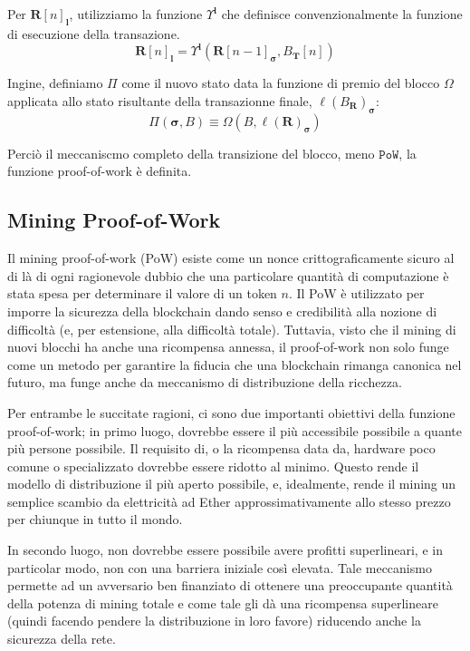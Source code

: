 \documentclass[9pt,oneside]{amsart}
\begin{document}
\begin{multicols}{2}
Per  $\mathbf{R}[n]_\mathbf{l}$, utilizziamo la funzione $\Upsilon^\mathbf{l}$ che definisce convenzionalmente la funzione di esecuzione della transazione.
\begin{equation}
\mathbf{R}[n]_\mathbf{l} = 
\Upsilon^\mathbf{l}(\mathbf{R}[n - 1]_{\boldsymbol{\sigma}}, B_\mathbf{T}[n])
\end{equation}

Ingine, definiamo $\Pi$ come il nuovo stato data la funzione di premio del blocco $\Omega$ applicata allo stato risultante della transazionne finale, $\ell(B_\mathbf{R})_{\boldsymbol{\sigma}}$:
\begin{equation}
\Pi(\boldsymbol{\sigma}, B) \equiv \Omega(B, \ell(\mathbf{R})_{\boldsymbol{\sigma}})
\end{equation}

Perciò il meccaniscmo completo della transizione del blocco, meno $\mathtt{PoW}$, la funzione proof-of-work è definita.

\subsection{Mining Proof-of-Work} \label{ch:pow}

Il mining proof-of-work (PoW) esiste come un nonce crittograficamente sicuro al di là di ogni ragionevole dubbio che una particolare quantità di computazione è stata spesa per determinare il valore di un token $n$. Il PoW è utilizzato per imporre la sicurezza della blockchain dando senso e credibilità alla nozione di difficoltà (e, per estensione, alla difficoltà totale). Tuttavia, visto che il mining di nuovi blocchi ha anche una ricompensa annessa, il proof-of-work non solo funge come un metodo per garantire la fiducia che una blockchain rimanga canonica nel futuro, ma funge anche da meccanismo di distribuzione della ricchezza.

Per entrambe le succitate ragioni, ci sono due importanti obiettivi della funzione proof-of-work; in primo luogo, dovrebbe essere il più accessibile possibile a quante più persone possibile. Il requisito di, o la ricompensa data da, hardware poco comune o specializzato dovrebbe essere ridotto al minimo. Questo rende il modello di distribuzione il più aperto possibile, e, idealmente, rende il mining un semplice scambio da elettricità ad Ether approssimativamente allo stesso prezzo per chiunque in tutto il mondo.

In secondo luogo, non dovrebbe essere possibile avere profitti superlineari, e in particolar modo, non con una barriera iniziale così elevata. Tale meccanismo permette ad un avversario ben finanziato di ottenere una preoccupante quantità della potenza di mining totale e come tale gli dà una ricompensa superlineare (quindi facendo pendere la distribuzione in loro favore) riducendo anche la sicurezza della rete.


\end{multicols}
\end{document}
